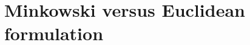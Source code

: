\documentclass[epsfig,12pt]{article}
\renewcommand{\theequation}{\thesection.\arabic{equation}}
\renewcommand{\theequation}{\thesection.\arabic{equation}}
\begin{document}
{%

\section{Minkowski versus Euclidean formulation}
 \renewcommand{\theequation}{\Alph{section}.\arabic{equation}}
\setcounter{equation}{0}
 
 \renewcommand{\thesubsection}{\Alph{section}.\arabic{subsection}}
\setcounter{subsection}{0}
\label{app:mink}

}
\end{document}
